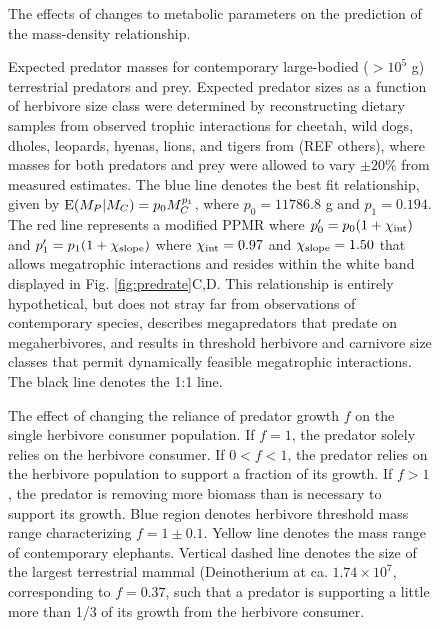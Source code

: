 \documentclass[11pt]{article}
\begin{document}
\begin{figure}[h!]
\caption{The effects of changes to metabolic parameters on the prediction of the mass-density relationship.}
\label{fig:corr}
\end{figure}



\begin{figure}[h!]
  \caption{
	 Expected predator masses for contemporary large-bodied ($>10^5$ g) terrestrial predators and prey. 
	 Expected predator sizes as a function of herbivore size class were determined by reconstructing dietary samples from observed trophic interactions for cheetah, wild dogs, dholes, leopards, hyenas, lions, and tigers from \citep{Hayward2008} (REF others), where masses for both predators and prey were allowed to vary $\pm 20\%$ from measured estimates.
	 The blue line denotes the best fit relationship, given by ${\rm E}(M_P|M_C) = p_0 M_C^{p_1}$, where $p_0 = 11786.8$ g and $p_1 = 0.194$.
	 The red line represents a modified PPMR where $p_0^\prime = p_0(1+\chi_{\rm int})$ and $p_1^\prime = p_1(1+\chi_{\rm slope})$ where $\chi_{\rm int} = 0.97$ and $\chi_{\rm slope} = 1.50$ that allows megatrophic interactions and resides within the white band displayed in Fig. \ref{fig:predrate}C,D.
	 This relationship is entirely hypothetical, but does not stray far from observations of contemporary species, describes megapredators that predate on megaherbivores, and results in threshold herbivore and carnivore size classes that permit dynamically feasible megatrophic interactions.
	 The black line denotes the 1:1 line.
  }
  \label{fig:ppmr}
\end{figure}

\begin{figure}[h!]
  \caption{
	  The effect of changing the reliance of predator growth $f$ on the single herbivore consumer population. If $f=1$, the predator solely relies on the herbivore consumer. If $0<f<1$, the predator relies on the herbivore population to support a fraction of its growth. If $f>1$, the predator is removing more biomass than is necessary to support its growth.
	  Blue region denotes herbivore threshold mass range characterizing $f=1 \pm 0.1$.
	  Yellow line denotes the mass range of contemporary elephants.
	  Vertical dashed line denotes the size of the largest terrestrial mammal (Deinotherium at ca. $1.74\times 10^7$, corresponding to $f=0.37$, such that a predator is supporting a little more than 1/3 of its growth from the herbivore consumer.
  }
  \label{fig:maxpreyvar}
\end{figure}
\end{document}
